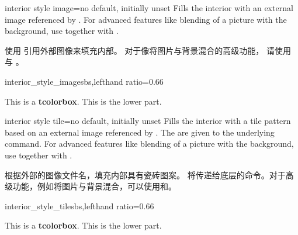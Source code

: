 \begin{docTcbKey}{interior style image}{=}{no default, initially unset}
Fills the interior with an external image referenced by .
For advanced features like blending of a picture with the background,
use  together with .

使用  引用外部图像来填充内部。 对于像将图片与背景混合的高级功能， 请使用  与 。
\begin{exdispExample*}{interior_style_image}{sbs,lefthand ratio=0.66}

\begin{tcolorbox}[enhanced,title=My title,
interior style image=goldshade.png]
This is a \textbf{tcolorbox}.
\tcblower
This is the lower part.
\end{tcolorbox}
\end{exdispExample*}
\end{docTcbKey}


\begin{docTcbKey}{interior style tile}{=}{no default, initially unset}
Fills the interior with a tile pattern based on an external image referenced by .
The  are given to the underlying  command.
For advanced features like blending of a picture with the background,
use  together with .

根据外部的图像文件名，填充内部具有瓷砖图案。 将传递给底层的命令。对于高级功能，例如将图片与背景混合，可以使用和。
\begin{exdispExample*}{interior_style_tile}{sbs,lefthand ratio=0.66}

\begin{tcolorbox}[enhanced,title=My title,
interior style tile={width=2cm}{crinklepaper.png}]
This is a \textbf{tcolorbox}.
\tcblower
This is the lower part.
\end{tcolorbox}
\end{exdispExample*}
\end{docTcbKey}

